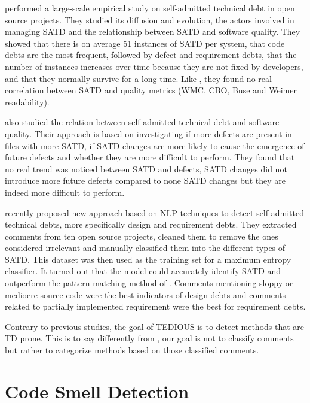 \citet{BavotaR16} performed a large-scale empirical study on self-admitted technical debt in open source projects. They studied its diffusion and evolution, the actors involved in managing \ac{SATD} and the relationship between \ac{SATD} and software quality. They showed that there is on average 51 instances of \ac{SATD} per system, that code debts are the most frequent, followed by defect and requirement debts, that the number of instances increases over time because they are not fixed by developers, and that they normally survive for a long time. Like \citet{griffith2014correspondence}, they found no real correlation between \ac{SATD} and quality metrics (\ac{WMC}, \ac{CBO}, Buse and Weimer readability). \par

\citet{wehaibi2016examining} also studied the relation between self-admitted technical debt and software quality. Their approach is based on investigating if more defects are present in files with more \ac{SATD}, if \ac{SATD} changes are more likely to cause the emergence of future defects and whether they are more difficult to perform. They found that no real trend was noticed between \ac{SATD} and defects, \ac{SATD} changes did not introduce more future defects compared to none \ac{SATD} changes but they are indeed more difficult to perform. \par

\citet{MaldonadoNLP} recently proposed new approach based on \ac{NLP} techniques to detect self-admitted technical debts, more specifically design and requirement debts. They extracted comments from ten open source projects, cleaned them to remove the ones considered irrelevant and manually classified them into the different types of \ac{SATD}. This dataset was then used as the training set for a maximum entropy classifier. It turned out that the model could accurately identify \ac{SATD} and outperform the pattern matching method of \citet{PotdarS14}. Comments mentioning sloppy or mediocre source code were the best indicators of design debts and comments related to partially implemented requirement were the best for requirement debts. \par

Contrary to previous studies, the goal of TEDIOUS is to detect methods that are TD prone. This is to say differently from \citet{MaldonadoS15}, our goal is not to classify comments but rather to categorize methods based on those classified comments.

\section{Code Smell Detection}

